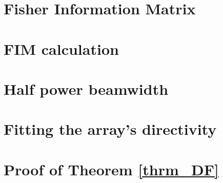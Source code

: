 \chapter{Fisher Information Matrix}
\label{apdx:FIM}

\chapter{FIM calculation}
\label{apdx_clacFim}

\chapter{Half power beamwidth}
\label{apdx_HPBW}

\chapter{Fitting the array's directivity}
\label{apndx_directivityFit}

\chapter{Proof of Theorem \ref{thrm_DF}}
\label{apdx_thrm_DF}







